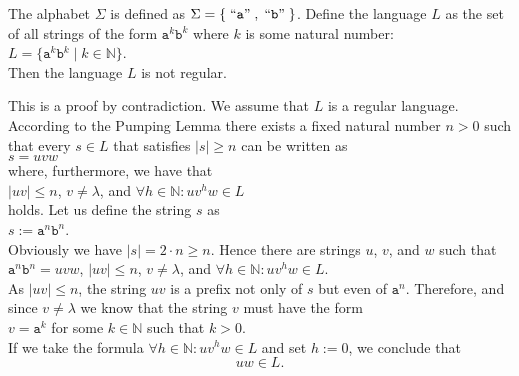 \begin{Proposition}
  The alphabet  $\Sigma$ is defined as $\Sigma = \{ \;\mbox{``\texttt{a}''}\;, \;\mbox{``\texttt{b}''}\; \}$.
  Define the language $L$ as the set of all strings of the form $\mathtt{a}^k\mathtt{b}^k$ where $k$
  is some natural number:
  \\[0.2cm]
  \hspace*{1.3cm}
  $L = \bigl\{ \mathtt{a}^k\mathtt{b}^k \mid k \in \mathbb{N} \bigr\}$.
  \\[0.2cm]
  Then the language  $L$ is not regular.
\end{Proposition}

\proofEng
This is a proof by contradiction. We assume that $L$ is a regular language.  According to the
Pumping Lemma there exists a fixed natural number $n>0$ such that every $s \in L$ that satisfies  $|s|
\geq n$ can be written as
\\[0.2cm]
\hspace*{1.3cm}
$s = uvw$
\\[0.2cm]
where, furthermore, we have that
\\[0.2cm]
\hspace*{1.3cm}
$|uv| \leq n$, \quad $v \not= \lambda$, \quad and \quad $\forall h \in \mathbb{N}: uv^h w \in L$
\\[0.2cm]
holds.  Let us define the string $s$ as
\\[0.2cm]
\hspace*{1.3cm}
$s := \mathtt{a}^{n} \mathtt{b}^{n}$.
\\[0.2cm]
Obviously we have $|s| = 2 \cdot n \geq n$.  Hence there are strings $u$, $v$, and $w$
such that 
\\[0.2cm]
\hspace*{1.3cm}
$\mathtt{a}^{n}\mathtt{b}^{n} = uvw$, \quad $|uv| \leq n$, \quad $v \not= \lambda$, 
\quad and \quad $\forall h \in \mathbb{N}: uv^h w \in L$.
\\[0.2cm]
As $|uv| \leq n$, the string $uv$ is a prefix not only of $s$ but even of $\mathtt{a}^n$. Therefore,
and since $v \not= \lambda$ we know that the string $v$ must have the form
\\[0.2cm]
\hspace*{1.3cm}
$v = \mathtt{a}^k$ \quad for some $k \in \mathbb{N}$ such that $k > 0$.
\\[0.2cm]
If we take the formula $\forall h \in \mathbb{N}: uv^h w \in L$ and set  $h:=0$, we conclude that
\begin{equation}
  \label{eq:pumping5}
 uw \in L. 
\end{equation}
